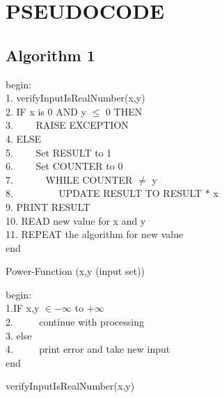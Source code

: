 \documentclass[a4paper,12pt]{article}
\begin{document}


\section{PSEUDOCODE}

\subsection{Algorithm 1}
\begin{algorithm}[H]
	begin: \\
	1. verifyInputIsRealNumber(x,y)\\
	2. IF x is 0 AND y $\leq$ 0 THEN \\
	3. $\hspace{2em}$RAISE EXCEPTION	\\
	4. ELSE \\
	5. $\hspace{2em}$Set RESULT to 1 \\
	6. $\hspace{2em}$Set COUNTER to 0\\
	7. $\hspace{3em}$WHILE COUNTER $\neq$ y \\
	8. $\hspace{4em}$ UPDATE RESULT TO RESULT * x\\
	9. 	PRINT RESULT \\
	10. READ new value for x and y\\
	11. REPEAT the algorithm for new value \\
	end
	\caption{Power-Function (x,y (input set))}
\end{algorithm}

\vspace{1cm}

\begin{algorithm}
	begin:\\
	1.IF  x,y $\in -\infty$  to  +$\infty$ \\
	2. $\hspace{2em}$ continue with processing\\
	3. else\\
	4. $\hspace{2em}$ print error and take new input \\
	end
	\caption{verifyInputIsRealNumber(x,y)}
\end{algorithm}
\end{document}
